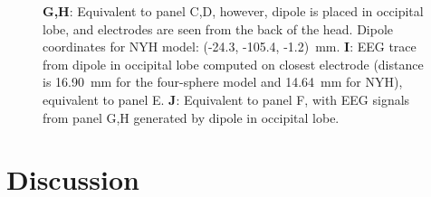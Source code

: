\documentclass[preprint,10pt,authoryear]{elsarticle}
\newcommand{\hlb}[2][NavyBlue]{ {\sethlcolor{#1} \hl{#2}} }
\newcommand{\hlg}[2][Emerald]{ {\sethlcolor{#1} \hl{#2}} }
\newcommand{\snnote}[1]{\color{white}{\hlb{SN: #1 }}\color{black}}
\newcommand{\tvnnote}[1]{\color{white}{\hlg{TVN: #1 }}\color{black}}
\begin{document}
\begin{figure}[H]
{		{\bf G,H}: Equivalent to panel C,D, however, dipole is placed in occipital lobe, and electrodes are seen from the back of the head. Dipole coordinates for NYH model: (-24.3, -105.4, -1.2)~mm.
		{\bf I}: EEG trace from dipole in occipital lobe computed on closest electrode (distance is 16.90~mm for the four-sphere model and 14.64~mm for NYH), equivalent to panel E.
		{\bf J}: Equivalent to panel F, with EEG signals from panel G,H generated by dipole in occipital lobe.
	}
	\label{fig:compare_head_models}
\end{figure}

\section{Discussion}\label{sec:discussion}
%
%
%
%
%
\end{document}

